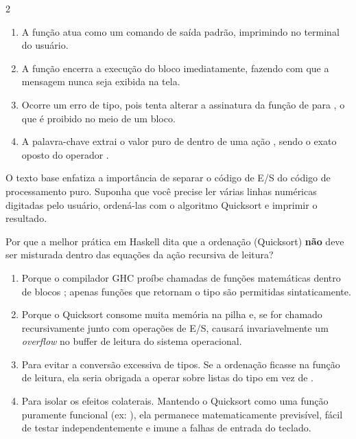 \documentclass[a4paper,10pt,brazil]{article}
\begin{document}
\begin{multicols}{2}
\begin{enumerate}
  \item A função  atua como um comando de saída padrão, imprimindo  no terminal do usuário.

  \item A função  encerra a execução do bloco  imediatamente, fazendo com que a mensagem  nunca seja exibida na tela.

  \item Ocorre um erro de tipo, pois  tenta alterar a assinatura da função de  para , o que é proibido no meio de um bloco.

  \item A palavra-chave  extrai o valor puro de dentro de uma ação , sendo o exato oposto do operador \haskellinline{<-}.


\end{enumerate}

O texto base enfatiza a importância de separar o código de E/S do código de processamento puro. Suponha que você precise ler várias linhas numéricas digitadas pelo usuário, ordená-las com o algoritmo Quicksort e imprimir o resultado. 

Por que a melhor prática em Haskell dita que a ordenação (Quicksort) \textbf{não} deve ser misturada dentro das equações da ação recursiva de leitura?

\begin{enumerate}
  \item Porque o compilador GHC proíbe chamadas de funções matemáticas dentro de blocos ; apenas funções que retornam o tipo  são permitidas sintaticamente.

  \item Porque o Quicksort consome muita memória na pilha e, se for chamado recursivamente junto com operações de E/S, causará invariavelmente um \emph{overflow} no buffer de leitura do sistema operacional.

  \item Para evitar a conversão excessiva de tipos. Se a ordenação ficasse na função de leitura, ela seria obrigada a operar sobre listas do tipo \haskellinline{[IO Int]} em vez de \haskellinline{[Int]}.

  \item Para isolar os efeitos colaterais. Mantendo o Quicksort como uma função puramente funcional (ex: \haskellinline{[Int] -> [Int]}), ela permanece matematicamente previsível, fácil de testar independentemente e imune a falhas de entrada do teclado.


\end{enumerate}
\end{multicols}
\end{document}
